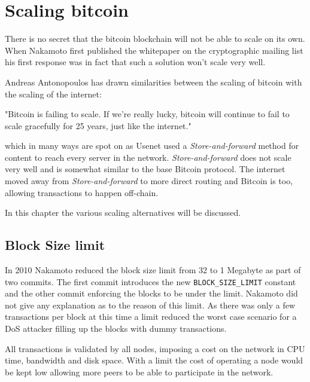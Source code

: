 \chapter{Scaling bitcoin}

There is no secret that the bitcoin blockchain will not be able to scale on its own. When Nakamoto first published the whitepaper on the cryptographic mailing list his first response was in fact that such a solution won't scale very well\cite{donald:scale}. 

Andreas Antonopoulos has drawn similarities between the scaling of bitcoin with the scaling of the internet:

\begin{displayquote}
	"Bitcoin is failing to scale. If we’re really lucky, bitcoin will continue to fail to scale gracefully for 25 years, just like the internet."\cite{antonopoulos:the:internet:of:money}
\end{displayquote}

which in many ways are spot on as Usenet used a \textit{Store-and-forward} method for content to reach every server in the network. \textit{Store-and-forward} does not scale very well and is somewhat similar to the base Bitcoin protocol. The internet moved away from \textit{Store-and-forward} to more direct routing and Bitcoin is too, allowing transactions to happen off-chain.

In this chapter the various scaling alternatives will be discussed.

\section{Block Size limit}

In 2010 Nakamoto reduced the block size limit from 32 to 1 Megabyte as part of two commits. The first commit introduces the new \texttt{BLOCK\_SIZE\_LIMIT} constant\cite{nakamoto:commit:1} and the other commit enforcing the blocks to be under the limit\cite{nakamoto:commit:2}. Nakamoto did not give any explanation as to the reason of this limit. As there was only a few transactions per block at this time a limit reduced the worst case scenario for a DoS attacker filling up the blocks with dummy transactions. 

All transactions is validated by all nodes, imposing a cost on the network in CPU time, bandwidth and disk space. With a limit the cost of operating a node would be kept low allowing more peers to be able to participate in the network. 

